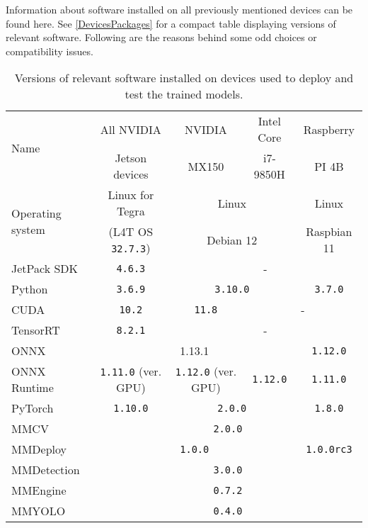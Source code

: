 Information about software installed on all previously mentioned devices can be
found here. See \autoref{DevicesPackages} for a compact table displaying
versions of relevant software. Following are the reasons behind some odd choices
or compatibility issues.

\begin{table}[t]
\centering
\small
\begin{tabular}{|l|c|c|c|c|}
    \hline
    \multirow{2}{*}{Name} & All NVIDIA     & NVIDIA & Intel Core  & Raspberry \\
                          & Jetson devices & MX150  & i7-9850H    & PI 4B \\
    \hline
    \multirow{2}{*}{Operating system} & Linux for Tegra             & \multicolumn{2}{c|}{Linux}     & Linux   \\
                                      & (L4T OS \texttt{32.7.3}) & \multicolumn{2}{c|}{Debian 12} & Raspbian 11   \\
    \hline
    JetPack SDK      & \texttt{4.6.3}                     & \multicolumn{3}{c|}{-}  \\
    \hline
    Python           & \texttt{3.6.9}                     & \multicolumn{2}{c|}{\texttt{3.10.0}} & \texttt{3.7.0} \\
    \hline
    CUDA             & \texttt{10.2}                      & \texttt{11.8} & \multicolumn{2}{c|}{-} \\
    \hline
    TensorRT         & \texttt{8.2.1} & \multicolumn{3}{c|}{-}             \\
    \hline
    ONNX             & \multicolumn{3}{c|}{1.13.1} & \texttt{1.12.0}             \\
    \hline
    ONNX Runtime     & \texttt{1.11.0} (ver. GPU) & \texttt{1.12.0} (ver. GPU) & \texttt{1.12.0} & \texttt{1.11.0}            \\
    \hline
    PyTorch          & \texttt{1.10.0} & \multicolumn{2}{c|}{\texttt{2.0.0}} & \texttt{1.8.0} \\
    \hline
    MMCV             & \multicolumn{4}{c|}{\texttt{2.0.0}} \\
    \hline
    MMDeploy         & \multicolumn{3}{c|}{\texttt{1.0.0}} & \texttt{1.0.0rc3} \\
    \hline
    MMDetection      & \multicolumn{4}{c|}{\texttt{3.0.0}} \\
    \hline
    MMEngine         & \multicolumn{4}{c|}{\texttt{0.7.2}} \\
    \hline
    MMYOLO           & \multicolumn{4}{c|}{\texttt{0.4.0}} \\
    \hline
\end{tabular}
\caption{Versions of relevant software installed on devices used to deploy and test the trained models.}
\label{DevicesPackages}
\end{table}


